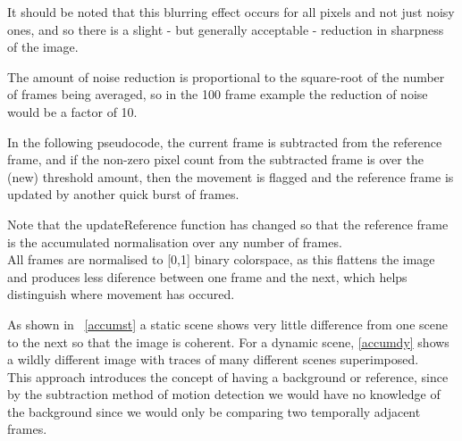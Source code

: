 {{It should be noted that this blurring effect occurs for all pixels and not just noisy ones, and so there is a slight - but generally acceptable - reduction in sharpness of the image.

The amount of noise reduction is proportional to the square-root of the number of frames being averaged, so in the 100 frame example the reduction of noise would be a factor of 10.

In the following pseudocode, the current frame is subtracted from the reference frame, and if the non-zero pixel count from the subtracted frame is over the (new) threshold amount, then the movement is flagged and the reference frame is updated by another quick burst of frames.

\vspace{-20pt}
\begin{frame}{}
	
\end{frame}

Note that the updateReference function has changed so that the reference frame is the accumulated normalisation over any number of frames. \\
All frames are normalised to [0,1]  binary colorspace, as this flattens the image and produces less diference between one frame and the next, which helps distinguish where movement has occured.

As shown in ~\cref{accumst} a static scene shows very little difference from one scene to the next so that the image is coherent. For a dynamic scene, \cref{accumdy} shows a wildly different image with traces of many different scenes superimposed.
\\This approach introduces the concept of having a background or reference, since by the subtraction method of motion detection we would have no knowledge of the background since we would only be comparing two temporally adjacent frames.

}}
